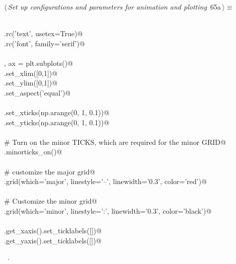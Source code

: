 \documentclass[11.5pt]{report}
\begin{document}
\begin{flushleft} \small
\begin{minipage}{\linewidth}\label{scrap93}\raggedright\small
{} $\langle\,${\itshape Set up configurations and parameters for animation and plotting}\nobreak\ {\footnotesize {65a}}$\,\rangle\equiv$
\vspace{-1ex}
\begin{list}{}{} \item
\mbox{}\verb@@\\
\mbox{}\verb@plt.rc('text', usetex=True)@\\
\mbox{}\verb@plt.rc('font', family='serif')@\\
\mbox{}\verb@@\\
\mbox{}\verb@fig, ax = plt.subplots()@\\
\mbox{}\verb@ax.set_xlim([0,1])@\\
\mbox{}\verb@ax.set_ylim([0,1])@\\
\mbox{}\verb@ax.set_aspect('equal')@\\
\mbox{}\verb@@\\
\mbox{}\verb@ax.set_xticks(np.arange(0, 1, 0.1))@\\
\mbox{}\verb@ax.set_yticks(np.arange(0, 1, 0.1))@\\
\mbox{}\verb@@\\
\mbox{}\verb@# Turn on the minor TICKS, which are required for the minor GRID@\\
\mbox{}\verb@ax.minorticks_on()@\\
\mbox{}\verb@@\\
\mbox{}\verb@# customize the major grid@\\
\mbox{}\verb@ax.grid(which='major', linestyle='--', linewidth='0.3', color='red')@\\
\mbox{}\verb@@\\
\mbox{}\verb@# Customize the minor grid@\\
\mbox{}\verb@ax.grid(which='minor', linestyle=':', linewidth='0.3', color='black')@\\
\mbox{}\verb@@\\
\mbox{}\verb@ax.get_xaxis().set_ticklabels([])@\\
\mbox{}\verb@ax.get_yaxis().set_ticklabels([])@\\
\mbox{}\verb@@{\NWsep}
\end{list}
\vspace{-1.5ex}
\footnotesize
\begin{list}{}{\setlength{\itemsep}{-\parsep}\setlength{\itemindent}{-\leftmargin}}
\item \NWtxtMacroRefIn\ .

\item{}
\end{list}
\end{minipage}\vspace{4ex}
\end{flushleft}
\end{document}
